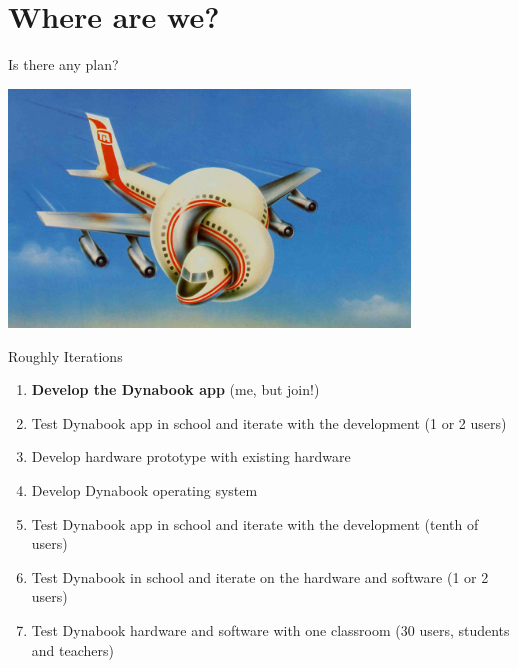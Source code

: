 \documentclass{beamer}
\begin{document}
\section{Where are we?}
\begin{frame}{Is there any plan?}
\begin{center}
  \includegraphics[width=0.8\textwidth]{anyPilot.jpeg}
\end{center}
\end{frame}
\begin{frame}{Roughly}
  Iterations
  \begin{enumerate}
  \item \textbf{Develop the Dynabook app} (me, but join!)
  \item Test Dynabook app in school and iterate with the development (1 or 2 users)
  \item Develop hardware prototype with existing hardware
  \item Develop Dynabook operating system
  \item Test Dynabook app in school and iterate with the development (tenth of users)
  \item Test Dynabook in school and iterate on the hardware and software (1 or 2 users)
  \item Test Dynabook hardware and software with one classroom (30 users, students and teachers)
  \end{enumerate}
\end{frame}
\end{document}
